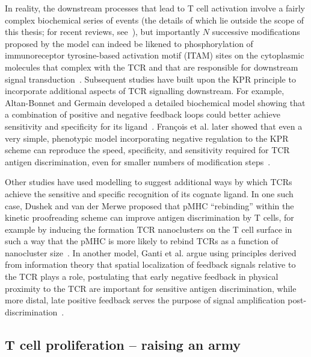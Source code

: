 In reality, the downstream processes that lead to T cell activation involve a fairly complex biochemical series of events (the details of which lie outside the scope of this thesis; for recent reviews, see~\cite{hwang2020recent,shah2021t}), but importantly $N$ successive modifications proposed by the model can indeed be likened to phosphorylation of immunoreceptor tyrosine-based activation motif (ITAM) sites on the cytoplasmic molecules that complex with the TCR and that are responsible for downstream signal transduction~\cite{vstefanova2003tcr,love2010itam}. Subsequent studies have built upon the KPR principle to incorporate additional aspects of TCR signalling downstream. For example, Altan-Bonnet and Germain developed a detailed biochemical model showing that a combination of positive and negative feedback loops could better achieve sensitivity and specificity for its ligand~\cite{altan2005modeling}. Fran\c{c}ois et al. later showed that even a very simple, phenotypic model incorporating negative regulation to the KPR scheme can reproduce the speed, specificity, and sensitivity required for TCR antigen discrimination, even for smaller numbers of modification steps~\cite{franccois2013phenotypic}.

Other studies have used modelling to suggest additional ways by which TCRs achieve the sensitive and specific recognition of its cognate ligand. In one such case, Dushek and van der Merwe proposed that pMHC ``rebinding'' within the kinetic proofreading scheme can improve antigen discrimination by T cells, for example by inducing the formation TCR nanoclusters  on the T cell surface in such a way that the pMHC is more likely to rebind TCRs as a function of nanocluster size~\cite{dushek2014induced}. In another model, Ganti et al. argue using principles derived from information theory that spatial localization of feedback signals relative to the TCR plays a role, postulating that early negative feedback in physical proximity to the TCR are important for sensitive antigen discrimination, while more distal, late positive feedback serves the purpose of signal amplification post-discrimination~\cite{ganti2020t}.

\subsection{T cell proliferation -- raising an army}
\label{sec:intro_overview_proliferation}

